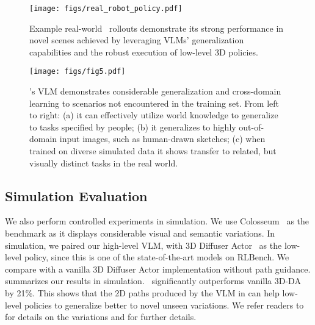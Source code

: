 \begin{figure}[!t]
    \centering
    \texttt{[image: figs/real\_robot\_policy.pdf]}
    \caption{\footnotesize{Example real-world \method\ rollouts demonstrate its strong performance in novel scenes achieved by leveraging VLMs' generalization capabilities and the robust execution of low-level 3D policies.}}
    \label{fig:experiments:real_robot_policy}
    \vspace{-4mm}
\end{figure}

\begin{figure}
    \centering
    \texttt{[image: figs/fig5.pdf]}
    \caption{\footnotesize{\method's VLM demonstrates considerable generalization and cross-domain learning to scenarios not encountered in the training set. From left to right: (a) it can effectively utilize world knowledge to generalize to tasks specified by people; (b) it generalizes to highly out-of-domain input images, such as human-drawn sketches; (c) when trained on diverse simulated data it shows transfer to related, but visually distinct tasks in the real world.}}
    \label{fig:vlm_generalization}
    \vspace{-4mm}
\end{figure}



\subsection{Simulation Evaluation}
\label{sec:appendix:simulation_results}
We also perform controlled experiments in simulation. We use Colosseum~\citep{pumacay2024colosseum} as the benchmark as it displays considerable visual and semantic variations. In simulation, we paired our high-level VLM, with 3D Diffuser Actor~\citep{ke20243d} as the low-level policy, since this is one of the state-of-the-art models on RLBench. We compare {\method} with a vanilla 3D Diffuser Actor implementation without path guidance.  summarizes our results in simulation. \method \ significantly outperforms vanilla 3D-DA by 21\%. This shows that the 2D paths produced by the VLM in {\method} can help low-level policies to generalize better to novel unseen variations. We refer readers to \citet{pumacay2024colosseum} for details on the variations and  for further details.



